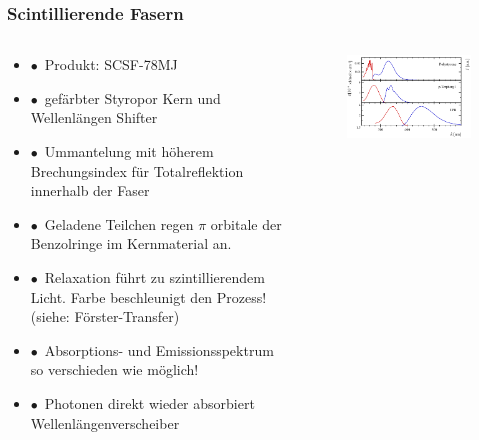 \documentclass[aspectratio=1610, 12pt, xcolor=dvipsnames]{beamer}
\begin{document}
\begin{frame}\frametitle{Scintillierende Fasern}
  \begin{columns}
    \begin{column}[c]{0.48\textwidth}
      \begin{itemize}
        \item $\bullet$\, Produkt: SCSF-78MJ
        \item $\bullet$\, gefärbter Styropor Kern und Wellenlängen Shifter
        \item $\bullet$\, Ummantelung mit höherem Brechungsindex für Totalreflektion innerhalb der Faser
        \item $\bullet$\, Geladene Teilchen regen $\pi$ orbitale der Benzolringe im Kernmaterial an.
        \item $\bullet$\, Relaxation führt zu szintillierendem Licht. Farbe beschleunigt den Prozess! (siehe: Förster-Transfer)
        \item $\bullet$\, Absorptions- und Emissionsspektrum so verschieden wie möglich!
        \item $\bullet$\, \to Photonen direkt wieder absorbiert \to Wellenlängenverscheiber
      \end{itemize}
    \end{column}
    \begin{column}[c]{0.48\textwidth}
      \begin{figure}
        \centering
        \includegraphics[width=\textwidth]{plots/shift_scifi.png}
      \end{figure}
    \end{column}
  \end{columns}
\end{frame}
\end{document}
